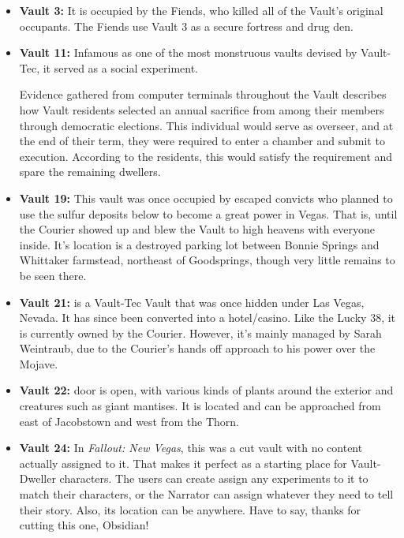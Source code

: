\documentclass[11pt]{article} %
\begin{document}
\begin{itemize}
	\item \textbf{Vault 3:}  It is occupied by the Fiends, who killed all of the Vault's original occupants. The Fiends use Vault 3 as a secure fortress and drug den.
	
	\item \textbf{Vault 11:} Infamous as one of the most monstruous vaults devised by Vault-Tec, it served as a social experiment. 
	
	Evidence gathered from computer terminals throughout the Vault describes how Vault residents selected an annual sacrifice from among their members through democratic elections. This individual would serve as overseer, and at the end of their term, they were required to enter a chamber and submit to execution. According to the residents, this would satisfy the requirement and spare the remaining dwellers.
	
	\item \textbf{Vault 19:} This vault was once occupied by escaped convicts who planned to use the sulfur deposits below to become a great power in Vegas. That is, until the Courier showed up and blew the Vault to high heavens with everyone inside. It's location is a destroyed parking lot between Bonnie Springs and Whittaker farmstead, northeast of Goodsprings, though very little remains to be seen there.
	
	\item \textbf{Vault 21:} is a Vault-Tec Vault that was once hidden under Las Vegas, Nevada. It has since been converted into a hotel/casino. Like the Lucky 38, it is currently owned by the Courier. However, it's mainly managed by Sarah Weintraub, due to the Courier's hands off approach to his power over the Mojave.
	
	\item \textbf{Vault 22:} door is open, with various kinds of plants around the exterior and creatures such as giant mantises. It is located and can be approached from east of Jacobstown and west from the Thorn.
	
	\item \textbf{Vault 24:} In \textit{Fallout: New Vegas}, this was a cut vault with no content actually assigned to it. That makes it perfect as a starting place for Vault-Dweller characters. The users can create assign any experiments to it to match their characters, or the Narrator can assign whatever they need to tell their story. Also, its location can be anywhere. Have to say, thanks for cutting this one, Obsidian!
	

\end{itemize}
\end{document}
